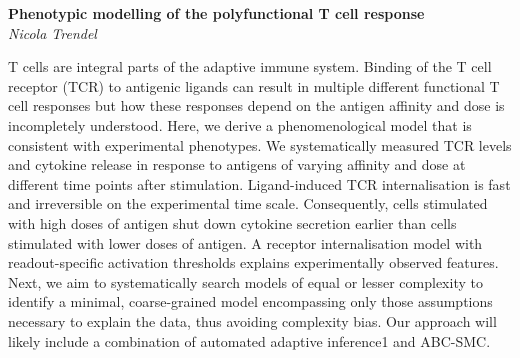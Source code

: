 \documentclass[12pt]{article}
\newcommand{\postertitle}[1]{{\Large\bf #1}\\[12pt]}
\newcommand{\authors}[1]{\emph{#1}\\}
\begin{document}
\begin{center}
\vspace*{0.5cm}
%
\postertitle{Phenotypic modelling of the polyfunctional T cell response}
%
\authors{Nicola Trendel} 
%
\vspace*{0.3cm}
\end{center}

T cells are integral parts of the adaptive immune system. Binding of the T cell receptor (TCR) to antigenic ligands can result in multiple different functional T cell responses but how these responses depend on the antigen affinity and dose is incompletely understood. Here, we derive a phenomenological model that is consistent with experimental phenotypes. We systematically measured TCR levels and cytokine release in response to antigens of varying affinity and dose at different time points after stimulation. Ligand-induced TCR internalisation is fast and irreversible on the experimental time scale. Consequently, cells stimulated with high doses of antigen shut down cytokine secretion earlier than cells stimulated with lower doses of antigen. A receptor internalisation model with readout-specific activation thresholds explains experimentally observed features. Next, we aim to systematically search models of equal or lesser complexity to identify a minimal, coarse-grained model encompassing only those assumptions necessary to explain the data, thus avoiding complexity bias. Our approach will likely include a combination of automated adaptive inference1 and ABC-SMC.
\end{document}
